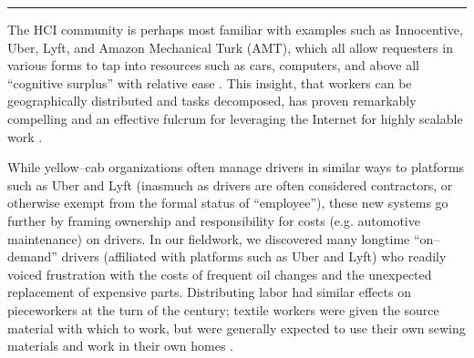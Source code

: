 \documentclass{sigchi}
\newcommand{\msb}[1]{{\color{PineGreen}[MSB: #1]}}
\begin{document}
\rule{\linewidth}{1pt}




The HCI community is perhaps most familiar with examples such as
Innocentive,
Uber, Lyft,
and Amazon Mechanical Turk (AMT),
which all allow requesters in various forms to tap into
resources such as
cars,
computers, and above all
``cognitive surplus''
with relative ease
\cite{howe2006rise,DillahuntPromise,storiesIraniSilberman,shirky2010cognitive}.
This insight, that
workers can be geographically distributed and tasks decomposed,
has proven remarkably compelling
and an effective fulcrum for leveraging the Internet for highly scalable work
\cite{sensitiveTasks,embracingErrorKrishna}.

While yellow--cab organizations often manage drivers in similar ways to platforms such as Uber and Lyft
(inasmuch as drivers are often considered contractors, or otherwise exempt from the formal status of ``employee''),
these new systems go further
by framing ownership and responsibility for costs
(e.g. automotive maintenance)
on drivers.
In our fieldwork, we discovered many longtime ``on--demand'' drivers
(affiliated with platforms such as Uber and Lyft)
who readily voiced frustration with the costs of
frequent oil changes and the unexpected replacement of expensive parts.
Distributing labor had similar effects on pieceworkers at the turn of the  century;
textile workers were given the source material with which to work,
but were generally expected to use their own sewing materials and work in their own homes
\cite{hapke2004sweatshop}.
\end{document}
